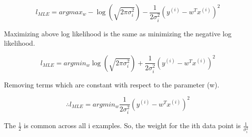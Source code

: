 \documentclass[11pt,addpoints,answers]{exam}
\begin{document}
\begin{questions}
\begin{your_solution}[title=Justification,height=10cm,width=15cm]
    \[l_{MLE} = argmax_w - \log(\sqrt{2\pi\sigma_i^2}) -\frac{1}{2\sigma_i^2}(y^{(i)} - w^Tx^{(i)})^2\]
    
    Maximizing above log likelihood is the same as minimizing the negative log likelihood.
    
    \[l_{MLE} = argmin_w \log(\sqrt{2\pi\sigma_i^2}) + \frac{1}{2\sigma_i^2}(y^{(i)} - w^Tx^{(i)})^2\]
    
    Removing terms which are constant with respect to the parameter (w).
    
    \[\therefore l_{MLE} = argmin_w \frac{1}{2\sigma_i^2}(y^{(i)} - w^Tx^{(i)})^2\]
    
    The $\frac{1}{2}$ is common across all i examples. So, the weight for the ith data point is $\frac{1}{\sigma_i^2}$
    \end{your_solution}

\end{questions}

\clearpage
\end{document}
